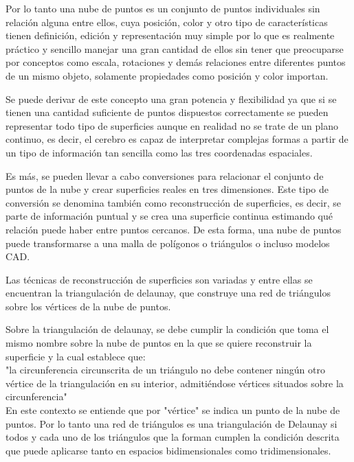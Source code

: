 Por lo tanto una nube de puntos es un conjunto de puntos individuales sin relación alguna entre ellos, cuya
posición, color y otro tipo de características tienen definición, edición y representación muy simple por lo
que es realmente práctico y sencillo manejar una gran cantidad de ellos sin tener que preocuparse por
conceptos como escala, rotaciones y demás relaciones entre diferentes puntos de un mismo objeto,
solamente propiedades como posición y color importan.




Se puede derivar de este concepto una gran potencia y flexibilidad ya que si se tienen una cantidad
suficiente de puntos dispuestos correctamente se pueden representar todo tipo de superficies aunque en
realidad no se trate de un plano continuo, es decir, el cerebro es capaz de interpretar complejas formas a
partir de un tipo de información tan sencilla como las tres coordenadas espaciales.

Es más, se pueden llevar a cabo conversiones para relacionar el conjunto de puntos de la nube y crear
superficies reales en tres dimensiones. Este tipo de conversión se denomina también como reconstrucción de superficies, es decir, se parte de información puntual y se crea una superficie continua estimando qué
relación puede haber entre puntos cercanos. De esta forma, una nube de puntos puede transformarse a una
malla de polígonos o triángulos o incluso modelos CAD.

Las técnicas de reconstrucción de superficies son variadas y entre ellas se encuentran la triangulación de
delaunay, que construye una red de triángulos sobre los vértices de la nube de puntos.

Sobre la triangulación de delaunay, se debe cumplir la condición que toma el mismo nombre sobre la nube de puntos en la que se quiere reconstruir la superficie y la cual establece que:
\\
"la circunferencia circunscrita de un triángulo no debe contener ningún otro vértice de la triangulación en su interior, admitiéndose vértices situados sobre la circunferencia"
\\
En este contexto se entiende que por "vértice" se indica un punto de la nube de puntos.
Por lo tanto una red de triángulos es una triangulación de Delaunay si todos y cada uno de los triángulos que la forman cumplen la condición descrita que puede aplicarse tanto en espacios bidimensionales como tridimensionales.

